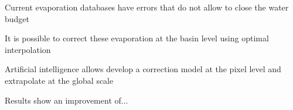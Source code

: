 \documentclass[draft]{agujournal2019}
\begin{document}



\begin{keypoints}
\item Current evaporation databases have errors that do not allow to close the water budget
\item It is possible to correct these evaporation at the basin level using optimal interpolation
\item Artificial intelligence allows develop a correction model at the pixel level and extrapolate at the global scale
\item Results show an improvement of...
\end{keypoints}

%
%

%
%

\end{document}
